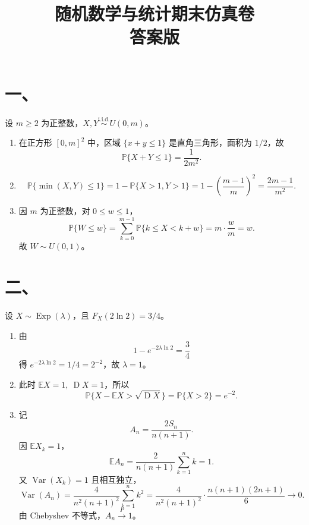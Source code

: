 \documentclass[UTF8,zihao=-4,fontset=windows]{ctexart}
\title{\vspace{-1.2cm}随机数学与统计期末仿真卷\\{\large 答案版}}
\date{}
\newcommand{\Prob}{\mathbb P}
\newcommand{\EX}{\mathbb E}
\newcommand{\DD}{\operatorname D}
\newcommand{\Var}{\operatorname{Var}}
\newcommand{\iid}{\overset{\mathrm{i.i.d.}}{\sim}}
\begin{document}
\maketitle
\vspace{-1.6em}

\section*{一、}
设 $m\ge 2$ 为正整数，$X,Y \iid U(0,m)$。
\begin{enumerate}
  \item 在正方形 $[0,m]^2$ 中，区域 $\{x+y\le 1\}$ 是直角三角形，面积为 $1/2$，故
  \[
    \Prob\{X+Y\le 1\}=\frac{1}{2m^2}.
  \]

  \item
  \[
    \Prob\{\min(X,Y)\le 1\}
    =1-\Prob\{X>1,Y>1\}
    =1-\left(\frac{m-1}{m}\right)^2
    =\frac{2m-1}{m^2}.
  \]

  \item 因 $m$ 为正整数，对 $0\le w\le 1$，
  \[
    \Prob\{W\le w\}
    =\sum_{k=0}^{m-1}\Prob\{k\le X<k+w\}
    =m\cdot\frac{w}{m}=w.
  \]
  故 $W\sim U(0,1)$。
\end{enumerate}

\section*{二、}
设 $X\sim \operatorname{Exp}(\lambda)$，且 $F_X(2\ln2)=3/4$。
\begin{enumerate}
  \item 由
  \[
    1-e^{-2\lambda\ln2}=\frac34
  \]
  得 $e^{-2\lambda\ln2}=1/4=2^{-2}$，故 $\lambda=1$。

  \item 此时 $\EX X=1,\ \DD X=1$，所以
  \[
    \Prob\{X-\EX X>\sqrt{\DD X}\}
    =\Prob\{X>2\}=e^{-2}.
  \]

  \item 记
  \[
    A_n=\frac{2S_n}{n(n+1)}.
  \]
  因 $\EX X_k=1$，
  \[
    \EX A_n=\frac{2}{n(n+1)}\sum_{k=1}^n k=1.
  \]
  又 $\Var(X_k)=1$ 且相互独立，
  \[
    \Var(A_n)=\frac{4}{n^2(n+1)^2}\sum_{k=1}^n k^2
    =\frac{4}{n^2(n+1)^2}\cdot\frac{n(n+1)(2n+1)}{6}\to 0.
  \]
  由 Chebyshev 不等式，$A_n\xrightarrow{P}1$。
\end{enumerate}
\end{document}
